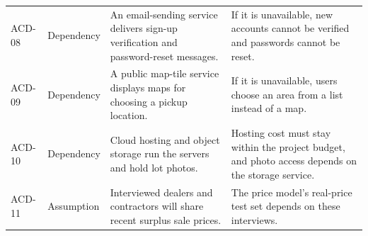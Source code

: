 {\begin{longtable}{@{}p{}p{}p{}p{}@{}}
ACD-08 & Dependency & An email-sending service delivers sign-up verification and password-reset messages. & If it is unavailable, new accounts cannot be verified and passwords cannot be reset. \\
ACD-09 & Dependency & A public map-tile service displays maps for choosing a pickup location. & If it is unavailable, users choose an area from a list instead of a map. \\
ACD-10 & Dependency & Cloud hosting and object storage run the servers and hold lot photos. & Hosting cost must stay within the project budget, and photo access depends on the storage service. \\
ACD-11 & Assumption & Interviewed dealers and contractors will share recent surplus sale prices. & The price model's real-price test set depends on these interviews. \\
\bottomrule
\end{longtable}
}

